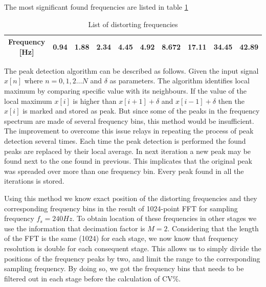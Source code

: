 \documentclass[twoside]{ctuthesis}
\theoremstyle{plain}
\theoremstyle{definition}
\theoremstyle{note}
\begin{document}
The most significant found frequencies are listed in table 	\ref{tab:DistortinFreq}%
\begin{table}[htbp]
	\centering
	\caption{List of distorting frequencies}
	\begin{tabular}{crrrrrrrrr}
		\midrule
		Frequency [Hz]  & 0.94  & 1.88   & 2.34 & 4.45   & 4.92  & 8.672  & 17.11   & 34.45 & 42.89 \\
				
		\bottomrule
	\end{tabular}%
	\label{tab:DistortinFreq}%
\end{table}%

The peak detection algorithm can be described as follows. Given the input signal $x[n]$ where $n=0,1,2\ldots N$ and $\delta$ as parameters. The algorithm identifies local maximum by comparing specific value with its neighbours. If the value of the local maximum $x[i]$ is higher than $x[i+1] + \delta $ and $x[i-1] + \delta$ then the $x[i]$ is marked and stored as peak.
But since some of the peaks in the frequency spectrum are made of several frequency bins, this method would be insufficient. The improvement to overcome this issue relays in repeating the process of peak detection several times. Each time the peak detection is performed the found peaks are replaced by their local average. In next iteration a new peak may be found next to the one found in previous. This implicates that the original peak was spreaded over more than one frequency bin. Every peak found in all the iterations is stored.

Using this method we know exact position of the distorting frequencies and they corresponding frequency bins in the result of 1024-point FFT for sampling frequency $f_s=240Hz$. To obtain location of these frequencies in other stages we use the information that decimation factor is $M=2$. Considering that the length of the FFT is the same (1024) for each stage, we now know that frequency resolution is double for each consequent stage. This allows us to simply divide the positions of the frequency peaks by two, and limit the range to the corresponding sampling frequency. By doing so, we got the frequency bins that needs to be filtered out in each stage before the calculation of CV\%.
\end{document}
